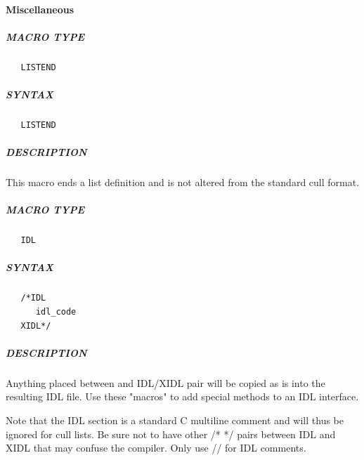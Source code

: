 \paragraph{Miscellaneous}
\subparagraph{MACRO TYPE}
\begin{verbatim}
   LISTEND
\end{verbatim}

\subparagraph{SYNTAX}
\begin{verbatim}
   LISTEND
\end{verbatim}

\subparagraph{DESCRIPTION}
   This macro ends a list definition and is not altered from the standard
   cull format.


\subparagraph{MACRO TYPE}
\begin{verbatim}
   IDL
\end{verbatim}

\subparagraph{SYNTAX}
\begin{verbatim}
   /*IDL
      idl_code
   XIDL*/
\end{verbatim}

\subparagraph{DESCRIPTION}
   Anything placed between and IDL/XIDL pair will be copied as is into the
   resulting IDL file. Use these "macros" to add special methods to an IDL
   interface.

   Note that the IDL section is a standard C multiline comment and will
   thus be ignored for cull lists. Be sure not to have other /* */ pairs
   between IDL and XIDL that may confuse the compiler. Only use // for
   IDL comments.

%
%
%
%

